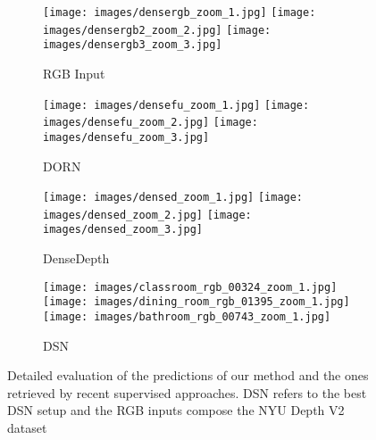 \documentclass[5p]{elsarticle}
\begin{document}
\begin{figure*}[t!]
     \centering
     \begin{subfigure}[t]{0.16\textwidth}
         \centering
         \caption{RGB Input}
         \texttt{[image: images/densergb\_zoom\_1.jpg]}
         \hspace{1em}
         \texttt{[image: images/densergb2\_zoom\_2.jpg]}
         \hspace{1em}
         \texttt{[image: images/densergb3\_zoom\_3.jpg]}
         \label{subfig2:rgb}
     \end{subfigure}
     \begin{subfigure}[t]{0.16\textwidth}
         \centering
         \caption{DORN \cite{fu2018deep}}
         \texttt{[image: images/densefu\_zoom\_1.jpg]}
         \hspace{1em}
         \texttt{[image: images/densefu\_zoom\_2.jpg]}
         \hspace{1em}
         \texttt{[image: images/densefu\_zoom\_3.jpg]}
         \label{subfig2:dorn}
     \end{subfigure}
          \begin{subfigure}[t]{0.16\textwidth}
         \centering
         \caption{DenseDepth \cite{alhashim2018high}}
         \texttt{[image: images/densed\_zoom\_1.jpg]}
         \hspace{1em}
         \texttt{[image: images/densed\_zoom\_2.jpg]}
         \hspace{1em}
         \texttt{[image: images/densed\_zoom\_3.jpg]}
         \label{subfig2:densed}
     \end{subfigure}
          \begin{subfigure}[t]{0.16\textwidth}
         \centering
         \caption{DSN}
         \texttt{[image: images/classroom\_rgb\_00324\_zoom\_1.jpg]}
         \hspace{1em}
         \texttt{[image: images/dining\_room\_rgb\_01395\_zoom\_1.jpg]}
         \hspace{1em}
         \texttt{[image: images/bathroom\_rgb\_00743\_zoom\_1.jpg]}
         \label{subfig2:dsn}
     \end{subfigure}
     \caption{Detailed evaluation of the predictions of our method and the ones retrieved by recent supervised approaches. DSN refers to the best DSN setup and the RGB inputs compose the NYU Depth V2 dataset \cite{silberman2012indoor}}
     \label{subfig2NYU:all}
\end{figure*}
\end{document}
